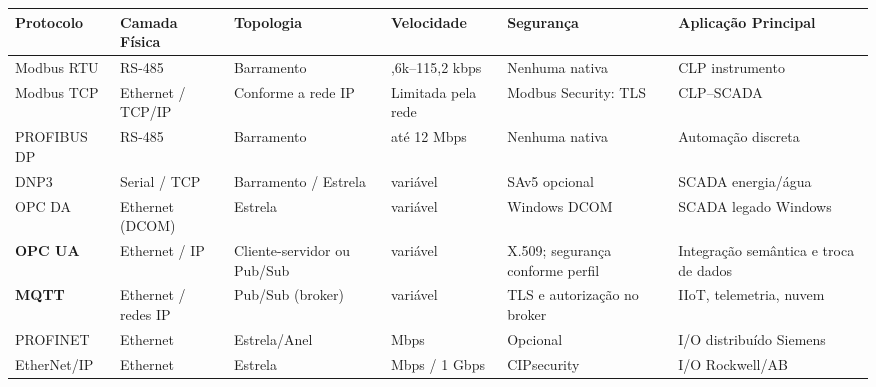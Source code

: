 \begin{longtable}[]{@{}
  >{\raggedright\arraybackslash}p{}
  >{\raggedright\arraybackslash}p{}
  >{\raggedright\arraybackslash}p{}
  >{\raggedright\arraybackslash}p{}
  >{\raggedright\arraybackslash}p{}
  >{\raggedright\arraybackslash}p{}@{}}
\toprule\noalign{}
\begin{minipage}[b]{\linewidth}\raggedright
Protocolo
\end{minipage} & \begin{minipage}[b]{\linewidth}\raggedright
Camada Física
\end{minipage} & \begin{minipage}[b]{\linewidth}\raggedright
Topologia
\end{minipage} & \begin{minipage}[b]{\linewidth}\raggedright
Velocidade
\end{minipage} & \begin{minipage}[b]{\linewidth}\raggedright
Segurança
\end{minipage} & \begin{minipage}[b]{\linewidth}\raggedright
Aplicação Principal
\end{minipage} \\
\midrule\noalign{}
\endhead
\bottomrule\noalign{}
\endlastfoot
Modbus RTU & RS-485 & Barramento & 9,6k--115,2 kbps & Nenhuma nativa & CLP instrumento \\
Modbus TCP & Ethernet / TCP/IP & Conforme a rede IP & Limitada pela rede & Modbus Security: TLS & CLP--SCADA \\
PROFIBUS DP & RS-485 & Barramento & até 12 Mbps & Nenhuma nativa & Automação discreta \\
DNP3 & Serial / TCP & Barramento / Estrela & variável & SAv5 opcional & SCADA energia/água \\
OPC DA & Ethernet (DCOM) & Estrela & variável & Windows DCOM & SCADA legado Windows \\
\textbf{OPC UA} & Ethernet / IP & Cliente-servidor ou Pub/Sub & variável & X.509; segurança conforme perfil & Integração semântica e troca de dados \\
\textbf{MQTT} & Ethernet / redes IP & Pub/Sub (broker) & variável & TLS e autorização no broker & IIoT, telemetria, nuvem \\
PROFINET & Ethernet & Estrela/Anel & 100 Mbps & Opcional & I/O distribuído Siemens \\
EtherNet/IP & Ethernet & Estrela & 100 Mbps / 1 Gbps & CIPsecurity & I/O Rockwell/AB \\
\end{longtable}

